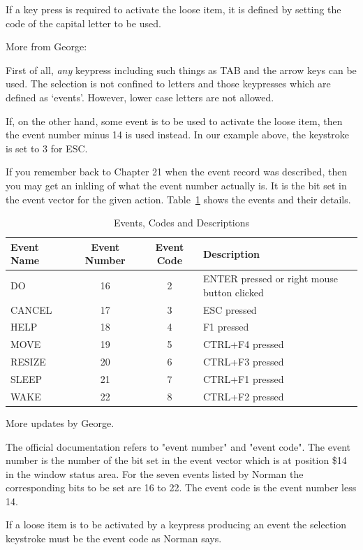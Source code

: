 If a key press is required to activate the loose item, it is defined by setting the
code of the capital letter to be used.

\begin{note}
More from George:

First of all, \emph{any} keypress including such things as TAB and the
arrow keys can be used. The selection is not confined to letters and those
keypresses which are defined as `events'. However, lower case letters are not
allowed.
\end{note}

If, on the other hand, some event is to be used to activate the loose item, then the
event number minus 14 is used instead. In our example above, the keystroke is set to 3 for ESC.

If you remember back to Chapter 21 when the event record was described, then you may
get an inkling of what the event number actually is. It is the bit set in the event vector
for the given action. Table~\ref{tab:EventsCodesDescriptions} shows the events and their details.

\begin{table}[htbp]
\centering
\begin{tabular}{l c c p{}}
\toprule
\textbf{Event Name} & \textbf{Event Number} & \textbf{Event Code} & \textbf{Description} \\
\midrule
%
DO     & 16 & 2 & ENTER pressed or right mouse button clicked \\
CANCEL & 17 & 3 & ESC pressed \\
HELP   & 18 & 4 & F1 pressed \\
MOVE   & 19 & 5 & CTRL+F4 pressed \\
RESIZE & 20 & 6 & CTRL+F3 pressed \\
SLEEP  & 21 & 7 & CTRL+F1 pressed \\
WAKE   & 22 & 8 & CTRL+F2 pressed \\
%
\bottomrule
\end{tabular}
\caption{Events, Codes and Descriptions}
\label{tab:EventsCodesDescriptions}
\end{table}


\begin{note}
More updates by George.

The official documentation refers to "event number" and "event code". The event number is the number of the bit
set in the event vector which is at position \$14 in the window status area. For the seven events listed by Norman the
corresponding bits to be set are 16 to 22. The event code is the event number less 14. 

If a loose item is to be activated by a keypress producing an event the selection keystroke must be the event
code as Norman says.
\end{note}

